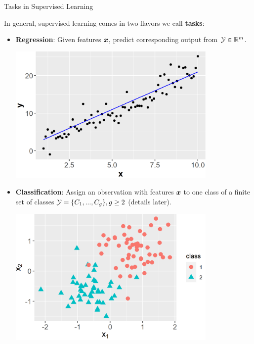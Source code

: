 \documentclass[11pt,compress,t,notes=noshow, xcolor=table]{beamer}
\begin{document}
\begin{vbframe}{Tasks in Supervised Learning}

In general, supervised learning comes in two flavors we call 
\textbf{tasks}:

\begin{itemize}

  \item \textbf{Regression}: Given features $\bm{x}$, predict corresponding 
  output from $\mathcal{Y} \in \mathbb{R}^m$.

  \begin{center}
    \includegraphics[width = 0.8\textwidth]{figure/ml-basics-supervised-regression-task.png} 
  \end{center}

\framebreak

  \item \textbf{Classification}: Assign an observation with features $\bm{x}$ to 
  one class of a finite set of classes $\mathcal{Y} = \{C_1,...,C_g\}, g \geq 2$
  (details later).
  
  \begin{center}
    \includegraphics[width = 0.8\textwidth]{figure/ml-basics-supervised-classif-task.png} 
  \end{center}
  
\end{itemize}
 
\end{vbframe}
\end{document}
